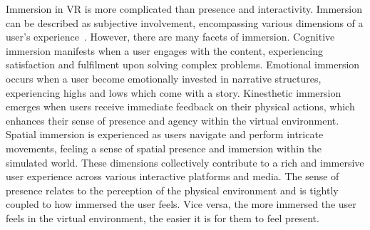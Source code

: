 Immersion in VR is more complicated than presence and interactivity.
Immersion can be described as subjective involvement, encompassing various dimensions of a user's experience~\cite{Nilsson2016}. 
However, there are many facets of immersion.
Cognitive immersion manifests when a user engages with the content, experiencing satisfaction and fulfilment upon solving complex problems. 
Emotional immersion occurs when a user become emotionally invested in narrative structures, experiencing highs and lows which come with a story. 
Kinesthetic immersion emerges when users receive immediate feedback on their physical actions, which enhances their sense of presence and agency within the virtual environment. 
Spatial immersion is experienced as users navigate and perform intricate movements, feeling a sense of spatial presence and immersion within the simulated world. 
These dimensions collectively contribute to a rich and immersive user experience across various interactive platforms and media.
The sense of presence relates to the perception of the physical environment and is tightly coupled to how immersed the user feels.
Vice versa, the more immersed the user feels in the virtual environment, the easier it is for them to feel present.

